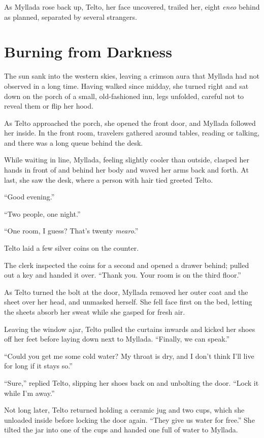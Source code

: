 As Myllada rose back up, Telto, her face uncovered, trailed her, eight \emph{eneo} behind as planned, separated by several strangers.

\chapter{Burning from Darkness}

The sun sank into the western skies, leaving a crimson aura that Myllada had not observed in a long time. Having walked since midday, she turned right and sat down on the porch of a small, old-fashioned inn, legs unfolded, careful not to reveal them or flip her hood.

As Telto approached the porch, she opened the front door, and Myllada followed her inside. In the front room, travelers gathered around tables, reading or talking, and there was a long queue behind the desk.

While waiting in line, Myllada, feeling slightly cooler than outside, clasped her hands in front of and behind her body and waved her arms back and forth. At last, she saw the desk, where a person with hair tied greeted Telto.

``Good evening.''

``Two people, one night.''

``One room, I guess? That's twenty \emph{mearo}.''

Telto laid a few silver coins on the counter.

The clerk inspected the coins for a second and opened a drawer behind; pulled out a key and handed it over. ``Thank you. Your room is on the third floor.''

\centeredstars

As Telto turned the bolt at the door, Myllada removed her outer coat and the sheet over her head, and unmasked herself. She fell face first on the bed, letting the sheets absorb her sweat while she gasped for fresh air.

Leaving the window ajar, Telto pulled the curtains inwards and kicked her shoes off her feet before laying down next to Myllada. ``Finally, we can speak.''

``Could you get me some cold water? My throat is dry, and I don't think I'll live for long if it stays so.''

``Sure,'' replied Telto, slipping her shoes back on and unbolting the door. ``Lock it while I'm away.''

Not long later, Telto returned holding a ceramic jug and two cups, which she unloaded inside before locking the door again. ``They give us water for free.'' She tilted the jar into one of the cups and handed one full of water to Myllada.

